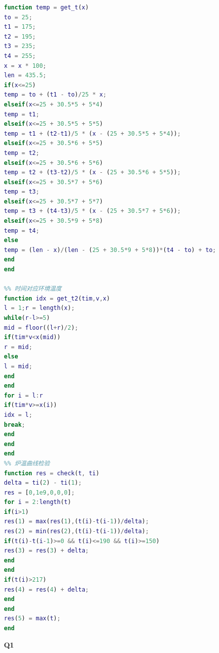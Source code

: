\documentclass[a4paper,12pt]{ctexart} %
\begin{document}
\begin{lstlisting}[language=matlab]
%% 边界温度分布函数
function temp = get_t(x)
to = 25;
t1 = 175;
t2 = 195;
t3 = 235;
t4 = 255;
x = x * 100;
len = 435.5;
if(x<=25)
temp = to + (t1 - to)/25 * x;
elseif(x<=25 + 30.5*5 + 5*4)
temp = t1;
elseif(x<=25 + 30.5*5 + 5*5)
temp = t1 + (t2-t1)/5 * (x - (25 + 30.5*5 + 5*4));
elseif(x<=25 + 30.5*6 + 5*5)
temp = t2;
elseif(x<=25 + 30.5*6 + 5*6)
temp = t2 + (t3-t2)/5 * (x - (25 + 30.5*6 + 5*5));
elseif(x<=25 + 30.5*7 + 5*6)
temp = t3;
elseif(x<=25 + 30.5*7 + 5*7)
temp = t3 + (t4-t3)/5 * (x - (25 + 30.5*7 + 5*6));
elseif(x<=25 + 30.5*9 + 5*8)
temp = t4;
else
temp = (len - x)/(len - (25 + 30.5*9 + 5*8))*(t4 - to) + to;
end
end

%% 时间对应环境温度
function idx = get_t2(tim,v,x)
l = 1;r = length(x);
while(r-l>=5)
mid = floor((l+r)/2);
if(tim*v<x(mid))
r = mid;
else
l = mid;
end
end
for i = l:r
if(tim*v>=x(i))
idx = l;
break;
end
end
end
%% 炉温曲线检验
function res = check(t, ti)
delta = ti(2) - ti(1);
res = [0,1e9,0,0,0];
for i = 2:length(t)
if(i>1)
res(1) = max(res(1),(t(i)-t(i-1))/delta);
res(2) = min(res(2),(t(i)-t(i-1))/delta);
if(t(i)-t(i-1)>=0 && t(i)<=190 && t(i)>=150)
res(3) = res(3) + delta;
end
end
if(t(i)>217)
res(4) = res(4) + delta;
end
end
res(5) = max(t);
end
	\end{lstlisting}\par
	\noindent\normalsize\textbf{Q1}
\end{document}
